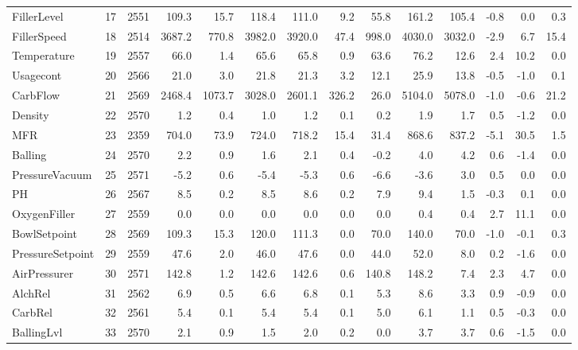 \documentclass[]{report}
\begin{document}
\begin{table}[H]
\begin{tabular}{lrrrrrrrrrrrrr}
\rowcolor{gray!6}  FillerLevel & 17 & 2551 & 109.3 & 15.7 & 118.4 & 111.0 & 9.2 & 55.8 & 161.2 & 105.4 & -0.8 & 0.0 & 0.3\\
FillerSpeed & 18 & 2514 & 3687.2 & 770.8 & 3982.0 & 3920.0 & 47.4 & 998.0 & 4030.0 & 3032.0 & -2.9 & 6.7 & 15.4\\
\rowcolor{gray!6}  Temperature & 19 & 2557 & 66.0 & 1.4 & 65.6 & 65.8 & 0.9 & 63.6 & 76.2 & 12.6 & 2.4 & 10.2 & 0.0\\
Usagecont & 20 & 2566 & 21.0 & 3.0 & 21.8 & 21.3 & 3.2 & 12.1 & 25.9 & 13.8 & -0.5 & -1.0 & 0.1\\
\addlinespace
\rowcolor{gray!6}  CarbFlow & 21 & 2569 & 2468.4 & 1073.7 & 3028.0 & 2601.1 & 326.2 & 26.0 & 5104.0 & 5078.0 & -1.0 & -0.6 & 21.2\\
Density & 22 & 2570 & 1.2 & 0.4 & 1.0 & 1.2 & 0.1 & 0.2 & 1.9 & 1.7 & 0.5 & -1.2 & 0.0\\
\rowcolor{gray!6}  MFR & 23 & 2359 & 704.0 & 73.9 & 724.0 & 718.2 & 15.4 & 31.4 & 868.6 & 837.2 & -5.1 & 30.5 & 1.5\\
Balling & 24 & 2570 & 2.2 & 0.9 & 1.6 & 2.1 & 0.4 & -0.2 & 4.0 & 4.2 & 0.6 & -1.4 & 0.0\\
\rowcolor{gray!6}  PressureVacuum & 25 & 2571 & -5.2 & 0.6 & -5.4 & -5.3 & 0.6 & -6.6 & -3.6 & 3.0 & 0.5 & 0.0 & 0.0\\
\addlinespace
PH & 26 & 2567 & 8.5 & 0.2 & 8.5 & 8.6 & 0.2 & 7.9 & 9.4 & 1.5 & -0.3 & 0.1 & 0.0\\
\rowcolor{gray!6}  OxygenFiller & 27 & 2559 & 0.0 & 0.0 & 0.0 & 0.0 & 0.0 & 0.0 & 0.4 & 0.4 & 2.7 & 11.1 & 0.0\\
BowlSetpoint & 28 & 2569 & 109.3 & 15.3 & 120.0 & 111.3 & 0.0 & 70.0 & 140.0 & 70.0 & -1.0 & -0.1 & 0.3\\
\rowcolor{gray!6}  PressureSetpoint & 29 & 2559 & 47.6 & 2.0 & 46.0 & 47.6 & 0.0 & 44.0 & 52.0 & 8.0 & 0.2 & -1.6 & 0.0\\
AirPressurer & 30 & 2571 & 142.8 & 1.2 & 142.6 & 142.6 & 0.6 & 140.8 & 148.2 & 7.4 & 2.3 & 4.7 & 0.0\\
\addlinespace
\rowcolor{gray!6}  AlchRel & 31 & 2562 & 6.9 & 0.5 & 6.6 & 6.8 & 0.1 & 5.3 & 8.6 & 3.3 & 0.9 & -0.9 & 0.0\\
CarbRel & 32 & 2561 & 5.4 & 0.1 & 5.4 & 5.4 & 0.1 & 5.0 & 6.1 & 1.1 & 0.5 & -0.3 & 0.0\\
\rowcolor{gray!6}  BallingLvl & 33 & 2570 & 2.1 & 0.9 & 1.5 & 2.0 & 0.2 & 0.0 & 3.7 & 3.7 & 0.6 & -1.5 & 0.0\\
\bottomrule
\end{tabular}
\endgroup{}
\end{table}
\end{document}
